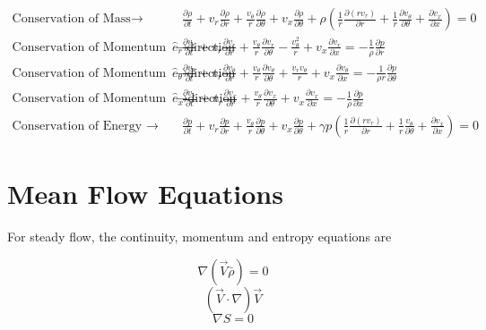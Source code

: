 \begin{align*}
\text{Conservation of Mass} \rightarrow& \frac{\partial \rho}{\partial t} + %
v_r \frac{\partial \rho}{\partial r} +
\frac{v_{\theta}   }{r}
\frac{\partial \rho}{\partial \theta} +
v_x \frac{\partial \rho}{\partial \theta} + 
\rho 
\left(
\frac{1}{r} \frac{\partial (rv_r)	}{\partial r} +
\frac{1}{r}	\frac{\partial v_{\theta}}{\partial \theta} +
\frac{\partial v_x}{\partial x}
\right) 
= 0 \\%
\text{Conservation of Momentum in the $\hat{e}_r$ direction} \rightarrow&\frac{\partial v_r}{\partial t} + 
v_r \frac{\partial v_r}{\partial r} +
\frac{v_{\theta}  }{r}
\frac{\partial v_r}{\partial \theta}- \frac{v_{\theta}^2}{r}+ 
v_x \frac{\partial v_r}{\partial x} 
= -\frac{1}{\rho} \frac{\partial p}{\partial r}\\  \text{Conservation of Momentum in the $\hat{e}_{\theta}$ direction} \rightarrow& 
\frac{\partial v_{\theta}}{\partial t} + 
v_r \frac{\partial v_{\theta}}{\partial r} +
\frac{v_{\theta}}{r}
\frac{\partial v_{\theta}}{\partial \theta} +
\frac{v_r v_{\theta}}{r}+ 
v_x \frac{\partial v_{\theta}}{\partial x} 
= -\frac{1}{\rho r} \frac{\partial p}{\partial \theta}\\ 
\text{Conservation of Momentum in the $\hat{e}_x$ direction} \rightarrow&
\frac{\partial v_{x}}{\partial t} + 
v_r 
\frac{\partial v_x}{\partial r} +
\frac{v_{\theta}}{r}
\frac{\partial v_x}{\partial \theta}+ 
v_x \frac{\partial v_x}{\partial x} 
= 
-\frac{1}{\rho } 
\frac{\partial p}{\partial x}\\  \text{Conservation of Energy } \rightarrow& 
\frac{\partial p }{\partial t} +
v_r 
\frac{\partial p}{\partial r} +
\frac{v_{\theta}}{r}
\frac{\partial p}{\partial \theta} +
v_x \frac{\partial p}{\partial \theta} + 
\gamma p 
\left(
\frac{1}{r}\frac{\partial (rv_r)}{\partial r} +
\frac{1}{r}\frac{v_{\theta}}{\partial \theta} +
\frac{\partial v_x}{\partial x}
\right) = 0
\end{align*}

\section{Mean Flow Equations}

For steady flow, the continuity, momentum and entropy equations are

\[\nabla (\vec{V} \bar{\rho}) = 0\]
\[(\vec{V}\cdot \nabla) \vec{V}\]
\[\nabla S = 0\]


